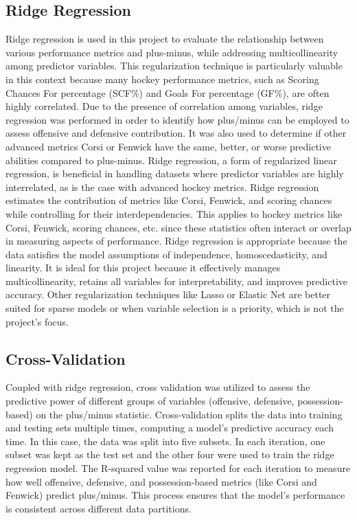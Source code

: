 \documentclass[12pt]{article}
\begin{document}
\subsection{Ridge Regression}

Ridge regression is used in this project to evaluate the relationship between various performance metrics and plus-minus, while addressing 
multicollinearity among predictor variables. This regularization technique is particularly valuable in this context because many hockey 
performance metrics, such as Scoring Chances For percentage (SCF\%) and Goals For percentage (GF\%), are often highly correlated.
Due to the presence of correlation among variables, ridge regression was performed in order to identify how plus/minus can be employed 
to assess offensive and defensive contribution. It was also used to determine if other advanced metrics Corsi or Fenwick have the same, 
better, or worse predictive abilities compared to plus-minus. Ridge regression, a form of regularized linear regression, is beneficial 
in handling datasets where predictor variables are highly interrelated, as is the case with advanced hockey metrics. Ridge regression 
estimates the contribution of metrics like Corsi, Fenwick, and scoring chances while controlling for their interdependencies. This 
applies to hockey metrics like Corsi, Fenwick, scoring chances, etc. since these statistics often interact or overlap in measuring aspects 
of performance. Ridge regression is appropriate because the data satisfies the model assumptions of independence, homoscedasticity, 
and linearity. It is ideal for this project because it effectively manages multicollinearity, retains all variables for interpretability, 
and improves predictive accuracy. Other regularization techniques like Lasso or Elastic Net are better suited for sparse models or when 
variable selection is a priority, which is not the project's focus. 

\subsection{Cross-Validation}

Coupled with ridge regression, cross validation was utilized to assess the predictive power of different groups of variables (offensive, 
defensive, possession-based) on the plus/minus statistic. Cross-validation splits the data into training and testing sets multiple times, 
computing a model's predictive accuracy each time. In this case, the data was split into five subsets. In each iteration, one subset was
kept as the test set and the other four were used to train the ridge regression model. The R-squared value was reported for each iteration
to measure how well offensive, defensive, and possession-based metrics (like Corsi and Fenwick) predict plus/minus. This process ensures 
that the model’s performance is consistent across different data partitions.
\end{document}
